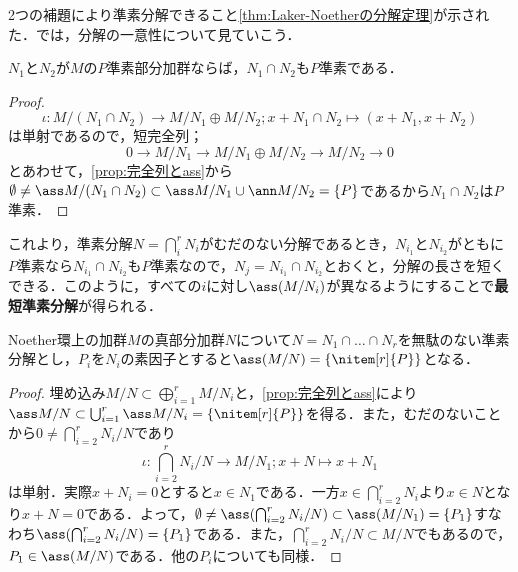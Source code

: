 2つの補題により準素分解できること\ref{thm:Laker-Noetherの分解定理}が示された．では，分解の一意性について見ていこう．
\begin{lem}
	$N_1$と$N_2$が$M$の$ P$準素部分加群ならば，$N_1\cap N_2$も$ P$準素である．
\end{lem}
\begin{proof}
	\[\iota:M/(N_1\cap N_2)\longrightarrow M/N_1\oplus M/N_2;x+N_1\cap N_2\longmapsto(x+N_1,x+N_2)\]
	は単射であるので，短完全列；
	\[0\longrightarrow M/N_1\longrightarrow M/N_1\oplus M/N_2\longrightarrow M/N_2\longrightarrow0\]
	とあわせて，\ref{prop:完全列とass}から$\emptyset\neq\ass M/(N_1\cap N_2)\subset\ass M/N_1\cup\ann M/N_2=\{P\}$であるから$N_1\cap N_2$は$P$準素．
\end{proof}

これより，準素分解$N=\bigcap_i^r N_i$がむだのない分解であるとき，$N_{i_1}$と$N_{i_2}$がともに$ P$準素なら$N_{i_1}\cap N_{i_2}$も$ P$準素なので，$N_j=N_{i_1}\cap N_{i_2}$とおくと，分解の長さを短くできる．このように，すべての$i$に対し$\ass (M/N_i)$が異なるようにすることで\textbf{最短準素分解}が得られる．
\begin{thm}
	Noether環上の加群$M$の真部分加群$N$について$N=N_1\cap\dots\cap N_r$を無駄のない準素分解とし，$ P_i$を$N_i$の素因子とすると$\ass (M/N)=\{\nitem[r]{ P}\}$となる．
\end{thm}
\begin{proof}
	埋め込み$M/N\subset\bigoplus_{i=1}^rM/N_i$と，\ref{prop:完全列とass}により$\ass M/N\subset \bigcup_{i=1}^r\ass M/N_i=\{\nitem[r]{ P}\}$を得る．また，むだのないことから$0\neq\bigcap_{i=2}^r N_i/N$であり
	\[\iota:\bigcap_{i=2}^rN_i/N\longrightarrow M/N_1;x+N\longmapsto x+N_1\]
	は単射．実際$x+N_i=0$とすると$x\in N_1$である．一方$x\in\bigcap_{i=2}^r N_i$より$x\in N$となり$x+N=0$である．よって，$\emptyset\neq\ass(\bigcap_{i=2}^r N_i/N)\subset\ass (M/N_1)=\{ P_1\}$すなわち$\ass(\bigcap_{i=2}^r N_i/N)=\{ P_1\}$である．また，$\bigcap_{i=2}^r N_i/N\subset M/N$でもあるので，$ P_1\in\ass (M/N)$である．他の$ P_i$についても同様．
\end{proof}


